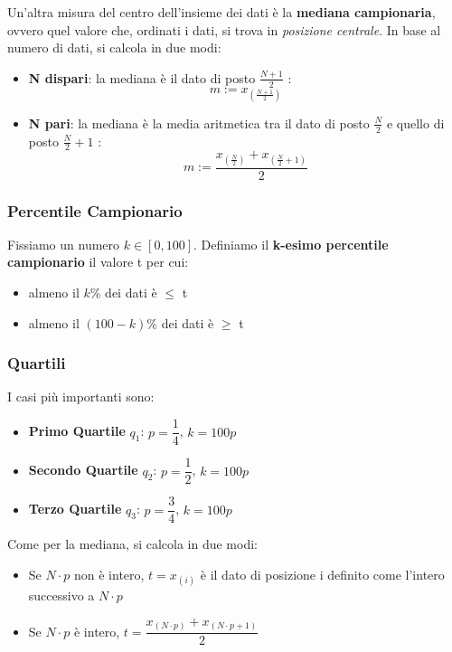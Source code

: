 Un'altra misura del centro dell'insieme dei dati è la \textbf{mediana campionaria}, ovvero quel valore che, ordinati i dati, si trova in \textit{posizione centrale}. In base al numero di dati, si calcola in due modi:

\begin{itemize}
    \item \textbf{N dispari}: la mediana è il dato di posto $\frac{N+1}{2}$ :  $$ m := x_{\left(\frac{N+1}{2}\right)} $$ 
    \item \textbf{N pari}: la mediana è la media aritmetica tra il dato di posto $\frac{N}{2}$ e quello di posto $\frac{N}{2} + 1$ :  $$ m := \frac{x_{\left(\frac{N}{2} \right)} + x_{\left(\frac{N}{2}+1\right)}}{2} $$
\end{itemize}

\subsubsection{Percentile Campionario}

Fissiamo un numero $ k \in [0, 100]$. Definiamo il \textbf{k-esimo percentile campionario} il valore t per cui:
\begin{itemize}
    \item almeno il $k\%$ dei dati è $\leq$ t
    \item almeno il $(100-k)\%$ dei dati è $\geq$ t
\end{itemize}

\subsubsection{Quartili}

I casi più importanti sono:
\begin{itemize}
    \item \textbf{Primo Quartile} $q_1$: $p = \dfrac{1}{4}$, $k=100p$
    \item \textbf{Secondo Quartile} $q_2$: $p = \dfrac{1}{2}$, $k=100p$
    \item \textbf{Terzo Quartile} $q_3$: $p = \dfrac{3}{4}$, $k=100p$
\end{itemize}

\noindent Come per la mediana, si calcola in due modi:
\begin{itemize}
    \item Se $N \cdot p$ non è intero, $t=x_{(i)}$ è il dato di posizione i definito come l'intero successivo a $N \cdot p$
    \item Se $N \cdot p$ è intero, $t= \dfrac{x_{(N \cdot p)} + x_{(N\cdot p+1)}}{2}$
\end{itemize}

